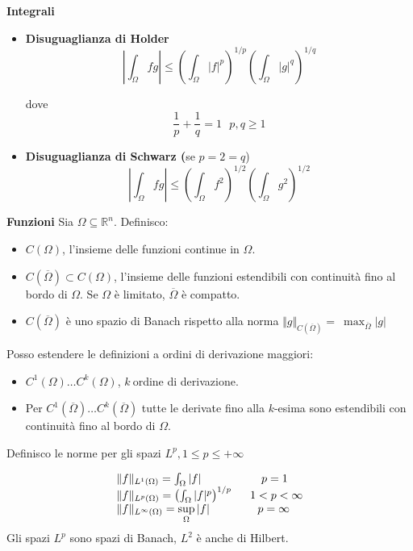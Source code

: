 \documentclass[10pt,a4paper,twoside,openright]{book}
\begin{document}
\textbf{Integrali}
\begin{itemize}
\item \textbf{Disuguaglianza di Holder}\begin{equation*}
\left| \int _{\Omega } fg\right| \leqslant \left(\int _{\Omega }| f| ^{p}\right)^{1/p}\left(\int _{\Omega }| g| ^{q}\right)^{1/q}
\end{equation*}

dove \begin{equation*}
\frac{1}{p} +\frac{1}{q} =1\ \ \ p,q\geqslant 1
\end{equation*}
\item \textbf{Disuguaglianza di Schwarz (}se $p=2=q$) \begin{equation*}
\left| \int _{\Omega } fg\right| \leqslant \left(\int _{\Omega } f^{2}\right)^{1/2}\left(\int _{\Omega } g^{2}\right)^{1/2}
\end{equation*}
\end{itemize}

\textbf{Funzioni}
Sia $\Omega \subseteq \mathbb{R}^{n}$. Definisco:
\begin{itemize}
	\item $C(\Omega)$, l'insieme delle funzioni continue in $\displaystyle \Omega $.
	\item $C(\overline{\Omega }) \subset C(\Omega)$, l'insieme delle funzioni estendibili con continuità fino al bordo di $\displaystyle \Omega $. Se $\Omega $ è limitato, $\overline{\Omega }$ è compatto. 
	\item $C(\overline{\Omega })$ è uno spazio di Banach rispetto alla norma $\displaystyle \Vert g\Vert _{C(\overline{\Omega })} =\ \max_{\overline{\Omega }}| g| $
\end{itemize}

Posso estendere le definizioni a ordini di derivazione maggiori:
\begin{itemize}
	\item $C^{1}(\Omega) \dotsc C^{k}(\Omega)$, $\displaystyle k\ $ordine di derivazione.
	\item Per $C^{1}(\overline{\Omega }) \dotsc C^{k}(\overline{\Omega })$ tutte le derivate fino alla $\displaystyle k$-esima sono estendibili con continuità fino al bordo di $\displaystyle \Omega $.
\end{itemize}

Definisco le norme per gli spazi $L^{p},1\leqslant p\leqslant +\infty $

\begin{equation*}
\begin{array}{ l l }
\Vert f\Vert _{L^{1}(\Omega)} =\int _{\Omega }| f|  & \ \ \ \ p=1\\
\Vert f\Vert _{L^{p}(\Omega)} =\left(\int _{\Omega }| f| ^{p}\right)^{1/p} \  & \ 1< p< \infty \\
\Vert f\Vert _{L^{\infty }(\Omega)} =\sup\limits _{\Omega }| f|  & \ \ \ p=\infty 
\end{array}
\end{equation*}
Gli spazi $\displaystyle L^{p}$ sono spazi di Banach, $\displaystyle L^{2}$ è anche di Hilbert.
\end{document}
